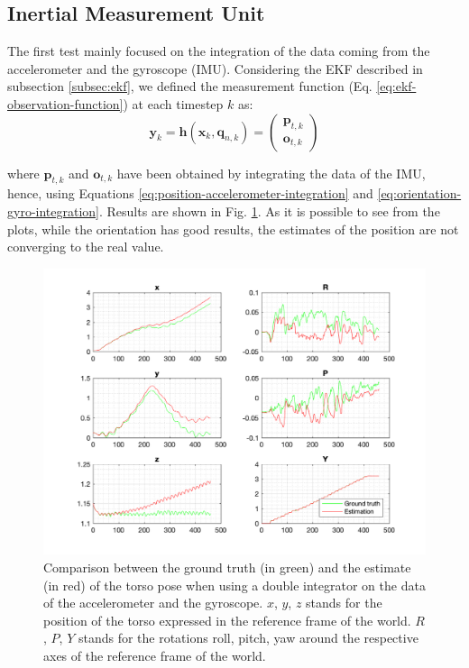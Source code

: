 \documentclass[a4paper]{article}
\begin{document}
\subsection{Inertial Measurement Unit}
The first test mainly focused on the integration of the data coming from
the accelerometer and the gyroscope (IMU). Considering the EKF described in
subsection \ref{subsec:ekf}, we defined the measurement function (Eq.
\ref{eq:ekf-observation-function}) at each timestep $k$ as:
\begin{equation}
    \bm{y}_k = \bm{h}(\bm{x}_k, \bm{q}_{n, k}) =
        \begin{pmatrix}
            \bm{p}_{t, k} \\
            \bm{o}_{t, k}
        \end{pmatrix}
\end{equation}

\noindent where $\bm{p}_{t, k}$ and $\bm{o}_{t, k}$ have been obtained by
integrating the data of the IMU, hence, using Equations \ref{eq:position-accelerometer-integration}
and \ref{eq:orientation-gyro-integration}. Results are shown in Fig.
\ref{fig:comp_ground_truth_estimated_torso_accelerometer}. As it is possible
to see from the plots, while the orientation has good results, the estimates of
the position are not converging to the real value.
\begin{figure}
    \centering
    \includegraphics[width=\textwidth]{images/accelerometer.png}
    \caption{Comparison between the ground truth (in green) and the estimate (in red) of the torso
        pose when using a double integrator on the data of the accelerometer
        and the gyroscope. $x$, $y$, $z$ stands for the position
        of the torso expressed in the reference frame of the
        world. $R$, $P$, $Y$ stands for the rotations roll,
        pitch, yaw around the respective axes of the
        reference frame of the world.}
    \label{fig:comp_ground_truth_estimated_torso_accelerometer}
\end{figure}
\end{document}
